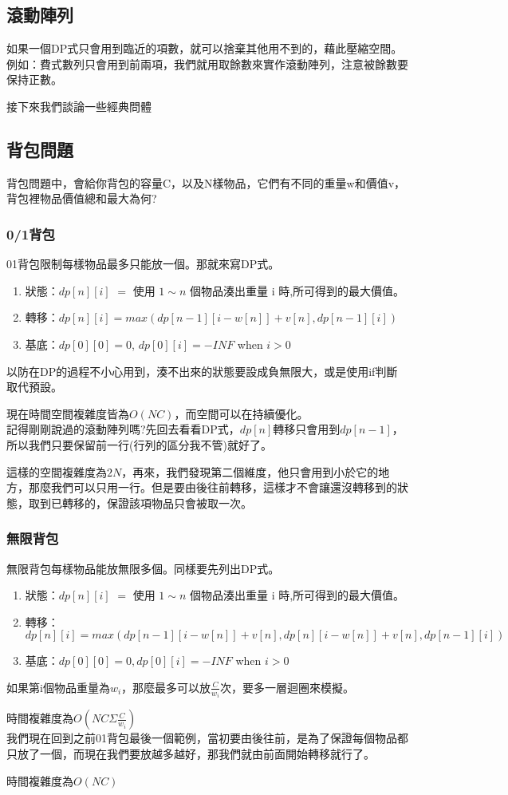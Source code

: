 \subsection{滾動陣列}
如果一個DP式只會用到臨近的項數，就可以捨棄其他用不到的，藉此壓縮空間。
例如：費式數列只會用到前兩項，我們就用取餘數來實作滾動陣列，注意被餘數要保持正數。

接下來我們談論一些經典問體
\subsection{背包問題}
背包問題中，會給你背包的容量C，以及N樣物品，它們有不同的重量w和價值v，背包裡物品價值總和最大為何?
\subsubsection{0/1背包}
01背包限制每樣物品最多只能放一個。那就來寫DP式。
\begin{enumerate}
\item 狀態：$dp[n][i]$ $=$ 使用 $1 ∼ n$ 個物品湊出重量 i 時,所可得到的最大價值。
\item 轉移：$dp[n][i] = max(dp[n − 1][i − w[n]] + v[n], dp[n − 1][i])$
\item 基底：$dp[0][0] = 0$, $dp[0][i] = −INF$ when $i>0$
\end{enumerate}
以防在DP的過程不小心用到，湊不出來的狀態要設成負無限大，或是使用if判斷取代預設。

現在時間空間複雜度皆為$O(NC)$，而空間可以在持續優化。\\
記得剛剛說過的滾動陣列嗎?先回去看看DP式，$dp[n]$轉移只會用到$dp[n-1]$，所以我們只要保留前一行(行列的區分我不管)就好了。

這樣的空間複雜度為$2N$，再來，我們發現第二個維度，他只會用到小於它的地方，那麼我們可以只用一行。但是要由後往前轉移，這樣才不會讓還沒轉移到的狀態，取到已轉移的，保證該項物品只會被取一次。

\subsubsection{無限背包}
無限背包每樣物品能放無限多個。同樣要先列出DP式。
\begin{enumerate}
\item 狀態：$dp[n][i]$ $=$ 使用 $1 ∼ n$ 個物品湊出重量 i 時,所可得到的最大價值。
\item 轉移：$dp[n][i] = max(dp[n − 1][i − w[n]] + v[n], dp[n][i − w[n]] + v[n], dp[n − 1][i])$
\item 基底：$dp[0][0] = 0, dp[0][i] = −INF$ when $i>0$
\end{enumerate}
如果第i個物品重量為$w_i$，那麼最多可以放$\frac{C}{w_i}$次，要多一層迴圈來模擬。

時間複雜度為$O(NC\Sigma\frac{C}{w_i})$\\
我們現在回到之前01背包最後一個範例，當初要由後往前，是為了保證每個物品都只放了一個，而現在我們要放越多越好，那我們就由前面開始轉移就行了。

時間複雜度為$O(NC)$
